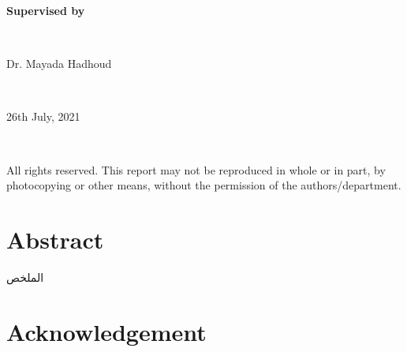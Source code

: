 \documentclass[a4paper,12pt]{article}
\begin{document}
\begin{titlepage}
\begin{minipage}{\textwidth}
\begin{center}
\textbf{\Large Supervised by}
\end{center} 
\end{minipage} \\[0.5cm]

\begin{minipage}{0.45\textwidth}
\begin{center} 
Dr. Mayada Hadhoud
\end{center}
\end{minipage} \\[1cm]

\begin{minipage}{0.45\textwidth}
\begin{center} 
26th July, 2021
\end{center}
\end{minipage} \\[0.5cm]

\begin{minipage}{\textwidth}
\begin{center} 
\small All rights reserved. This report may not be reproduced in whole or in part, by photocopying or other means, without the permission of the authors/department.
\end{center}
\end{minipage}

\end{titlepage}


\section*{Abstract}


\newpage

\begin{arabtext}
{\LARGE
الملخص
}\vspace{20pt}

\end{arabtext}

\newpage

\section*{Acknowledgement}

\end{document}
